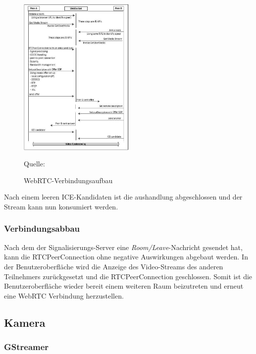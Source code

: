 \documentclass{article}
\newcommand{\figuresource}[1]{
	\begin{center}Quelle: #1\end{center}
}
\begin{document}
\begin{onecolumn}
\begin{figure}[ht]
	\includegraphics[width=0.5\textwidth]{cited-webrtc-connection-establishment}
	\centering
	\caption[WebRTC-Verbindungsaufbau~\cite{WebRTC}]{WebRTC-Verbindungsaufbau}
	\figuresource{\cite{WebRTC}}
\end{figure}

Nach einem leeren ICE-Kandidaten ist die aushandlung abgeschlossen und der
Stream kann nun konsumiert werden.

\subsubsection{Verbindungsabbau}

Nach dem der Signalisierungs-Server eine \textit{Room/Leave}-Nachricht gesendet
hat, kann die RTCPeerConnection ohne negative Auswirkungen abgebaut werden. In
der Benutzeroberfläche wird die Anzeige des Video-Streams des anderen
Teilnehmers zurückgesetzt und die RTCPeerConnection geschlossen. Somit ist die
Benutzeroberfläche wieder bereit einem weiteren Raum beizutreten und erneut
eine WebRTC Verbindung herzustellen.


\subsection{Kamera}

\subsubsection{GStreamer}


\end{onecolumn}
\end{document}
